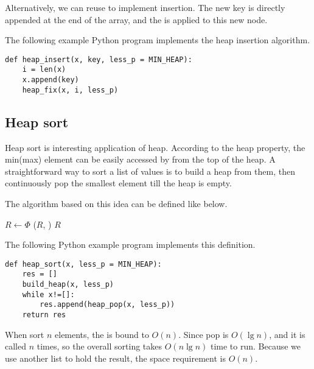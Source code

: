 \documentclass{article}
\begin{document}
Alternatively, we can reuse  to implement
insertion. The new key is directly appended at the end of the array,
and the  is applied to this new node.

\begin{algorithmic}[1]
  \State {}
  \State {}
\EndFunction
\end{algorithmic}

The following example Python program implements the heap insertion
algorithm.

\lstset{language=Python}
\begin{lstlisting}
def heap_insert(x, key, less_p = MIN_HEAP):
    i = len(x)
    x.append(key)
    heap_fix(x, i, less_p)
\end{lstlisting}

\subsection{Heap sort}
\label{heap-sort}

Heap sort is interesting application of heap. According
to the heap property, the min(max) element can be easily accessed
by from the top of the heap. A straightforward way to sort a list
of values is to build a heap from them, then continuously
pop the smallest element till the heap is empty.

The algorithm based on this idea can be defined like below.

\begin{algorithmic}[1]
  \State $R \gets \Phi$
  \State {}
    \State {}($R$, )
  \EndWhile
  \State \Return $R$
\EndFunction
\end{algorithmic}

The following Python example program implements this definition.

\lstset{language=Python}
\begin{lstlisting}
def heap_sort(x, less_p = MIN_HEAP):
    res = []
    build_heap(x, less_p)
    while x!=[]:
        res.append(heap_pop(x, less_p))
    return res
\end{lstlisting}

When sort $n$ elements, the  is bound to $O(n)$.
Since pop is $O(\lg n)$, and it
is called $n$ times, so the overall sorting takes $O(n \lg n)$
time to run. Because we use another list to hold the result,
the space requirement is $O(n)$.
\end{document}
